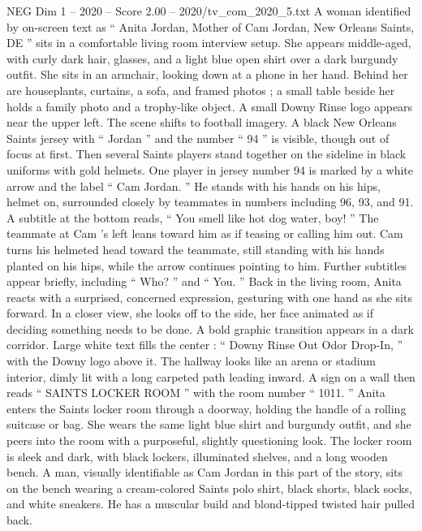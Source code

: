 \begin{textsample}{NEG Dim 1 – 2020 – Score 2.00 – 2020/tv\_com\_2020\_5.txt}  \label{ex:f1_neg_084}
A woman identified by on-screen text as “ Anita Jordan, Mother of Cam Jordan, New Orleans Saints, DE ” sits in a comfortable living room interview setup.
She appears middle-aged, with curly dark hair, glasses, and a light blue open shirt over a dark burgundy outfit.
She sits in an armchair, looking down at a phone in her hand.
Behind her are houseplants, curtains, a sofa, and framed photos ; a small table beside her holds a family photo and a trophy-like object.
A small Downy Rinse logo appears near the upper left.
The scene shifts to football imagery.
A black New Orleans Saints jersey with “ Jordan ” and the number “ 94 ” is visible, though out of focus at first.
Then several Saints players stand together on the sideline in black uniforms with gold helmets.
One player in jersey number 94 is marked by a white arrow and the label “ Cam Jordan. ” He stands with his hands on his hips, helmet on, surrounded closely by teammates in numbers including 96, 93, and 91.
A subtitle at the bottom reads, “ You smell like hot dog water, boy! ” The teammate at Cam ’s left leans toward him as if teasing or calling him out.
Cam turns his helmeted head toward the teammate, still standing with his hands planted on his hips, while the arrow continues pointing to him.
Further subtitles appear briefly, including “ Who? ” and “ You. ” Back in the living room, Anita reacts with a surprised, concerned expression, gesturing with one hand as she sits forward.
In a closer view, she looks off to the side, her face animated as if deciding something needs to be done.
A bold graphic transition appears in a dark corridor.
Large white text fills the center : “ Downy Rinse Out Odor Drop-In, ” with the Downy logo above it.
The hallway looks like an arena or stadium interior, dimly lit with a long carpeted path leading inward.
A sign on a wall then reads “ SAINTS LOCKER ROOM ” with the room number “ 1011. ” Anita enters the Saints locker room through a doorway, holding the handle of a rolling suitcase or bag.
She wears the same light blue shirt and burgundy outfit, and she peers into the room with a purposeful, slightly questioning look.
The locker room is sleek and dark, with black lockers, illuminated shelves, and a long wooden bench.
A man, visually identifiable as Cam Jordan in this part of the story, sits on the bench wearing a cream-colored Saints polo shirt, black shorts, black socks, and white sneakers.
He has a muscular build and blond-tipped twisted hair pulled back.

\end{textsample}
